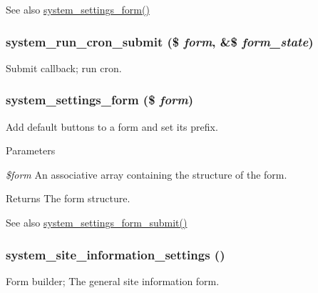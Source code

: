 \begin{DoxySeeAlso}{See also}
\hyperlink{group__forms_ga6fb270d34465d846cd4659a85d3e40c8}{system\_\-settings\_\-form()} 
\end{DoxySeeAlso}
\hypertarget{group__forms_ga81d2d4dbfd508cdcafdd808cda332b7c}{
\subsubsection[{system\_\-run\_\-cron\_\-submit}]{\setlength{\rightskip}{0pt plus 5cm}system\_\-run\_\-cron\_\-submit (\$ {\em form}, \/  \&\$ {\em form\_\-state})}}
\label{group__forms_ga81d2d4dbfd508cdcafdd808cda332b7c}
Submit callback; run cron. \hypertarget{group__forms_ga6fb270d34465d846cd4659a85d3e40c8}{
\subsubsection[{system\_\-settings\_\-form}]{\setlength{\rightskip}{0pt plus 5cm}system\_\-settings\_\-form (\$ {\em form})}}
\label{group__forms_ga6fb270d34465d846cd4659a85d3e40c8}
Add default buttons to a form and set its prefix.


\begin{DoxyParams}{Parameters}
\item[{\em \$form}]An associative array containing the structure of the form.\end{DoxyParams}
\begin{DoxyReturn}{Returns}
The form structure.
\end{DoxyReturn}
\begin{DoxySeeAlso}{See also}
\hyperlink{system_8module_a1ac9556d37dcf1ec5836b0171757c610}{system\_\-settings\_\-form\_\-submit()} 
\end{DoxySeeAlso}
\hypertarget{group__forms_ga80e6b3130e47d51243151f1aa04742a3}{
\subsubsection[{system\_\-site\_\-information\_\-settings}]{\setlength{\rightskip}{0pt plus 5cm}system\_\-site\_\-information\_\-settings ()}}
\label{group__forms_ga80e6b3130e47d51243151f1aa04742a3}
Form builder; The general site information form.

